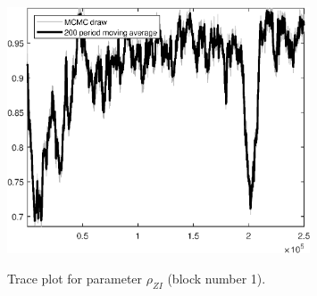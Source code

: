 \begin{figure}[H]
\centering
  \includegraphics[width=0.8\textwidth]{BRS_aggregate/graphs/TracePlot_rho_ZI_blck_1}\\
    \caption{Trace plot for parameter ${\rho_{ZI}}$ (block number 1).}
\end{figure}

